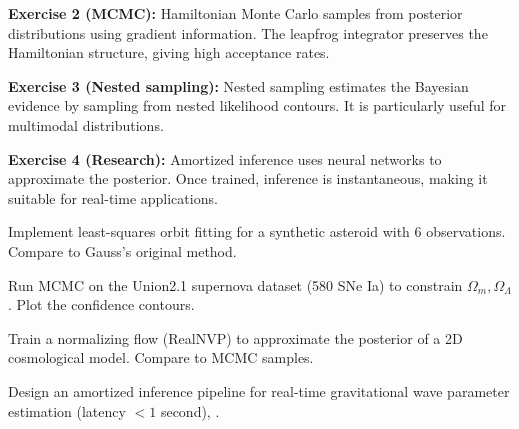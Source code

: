 \begin{solution}
\textbf{Exercise 2 (MCMC):} Hamiltonian Monte Carlo samples from posterior distributions using gradient information. The leapfrog integrator preserves the Hamiltonian structure, giving high acceptance rates.
\end{solution}

\begin{solution}
\textbf{Exercise 3 (Nested sampling):} Nested sampling estimates the Bayesian evidence by sampling from nested likelihood contours. It is particularly useful for multimodal distributions.
\end{solution}

\begin{solution}
\textbf{Exercise 4 (Research):} Amortized inference uses neural networks to approximate the posterior. Once trained, inference is instantaneous, making it suitable for real-time applications.
\end{solution}

\label{sec:astro:exercises}

\begin{exercise}
Implement least-squares orbit fitting for a synthetic asteroid with 6 observations. Compare to Gauss's original method.
\end{exercise}

\begin{exercise}
Run MCMC on the Union2.1 supernova dataset (580 SNe Ia) to constrain $\Omega_m, \Omega_\Lambda$. Plot the confidence contours.
\end{exercise}

\begin{exercise}
Train a normalizing flow (RealNVP) to approximate the posterior of a 2D cosmological model. Compare to MCMC samples.
\end{exercise}

\begin{exercise}[Research]
Design an amortized inference pipeline for real-time gravitational wave parameter estimation (latency $< 1$ second), \cite{desouza2025astronomy}.
\end{exercise}